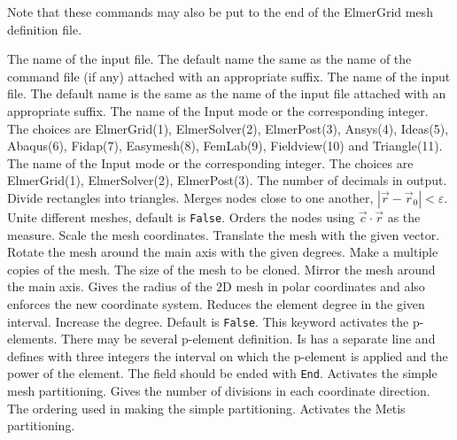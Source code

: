 Note that these commands may also be put to the end of the ElmerGrid mesh 
definition file.

\sifbegin
{}
The name of the input file.
The default name the same as the name of the command file (if any) 
attached with an appropriate suffix. 
%
The name of the input file.
The default name is the same as the name of the input file
attached with an appropriate suffix. 
%
The name of the Input mode or the corresponding integer. 
The choices are ElmerGrid(1), ElmerSolver(2), ElmerPost(3), 
Ansys(4), Ideas(5), Abaqus(6), Fidap(7), Easymesh(8), 
FemLab(9), Fieldview(10) and Triangle(11).
%
The name of the Input mode or the corresponding integer. 
The choices are ElmerGrid(1), ElmerSolver(2), ElmerPost(3).
%
The number of decimals in output.
%
Divide rectangles into triangles.
%
Merges nodes close to one another, $|\vec{r}-\vec{r}_0| < \varepsilon$.
%
Unite different meshes, default is \texttt{False}.
%
Orders the nodes using $\vec{c}\cdot\vec{r}$ as the measure.
%
Scale the mesh coordinates. 
%
Translate the mesh with the given vector.
%
Rotate the mesh around the main axis with the given degrees.
%
Make a multiple copies of the mesh.
%
The size of the mesh to be cloned.
%
Mirror the mesh around the main axis.
%
Gives the radius of the 2D mesh in polar coordinates 
and also enforces the new coordinate system.
%
Reduces the element degree in the given interval.
%
Increase the degree. Default is \texttt{False}.
%
This keyword activates the p-elements. 
There may be several p-element definition. Is 
has a separate line and defines with three integers the interval
on which the p-element is applied and the power of the element.
The field should be ended with \texttt{End}.
%
Activates the simple mesh partitioning.
Gives the number of divisions in each coordinate 
direction.
%
The ordering used in making the simple partitioning.
%
Activates the Metis partitioning.
%
